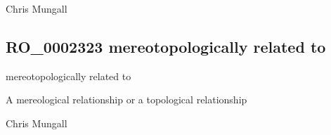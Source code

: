 \documentclass[letterpaper,10pt,english]{sphinxmanual}
\begin{document}
\begin{sphinxShadowBox}

\sphinxAtStartPar
Chris Mungall
\end{sphinxShadowBox}
\begin{quote}

\ignorespaces \end{quote}


\subsection{RO\_0002323 \sphinxhyphen{} mereotopologically related to}
\label{\detokenize{doc-RO_0002323:ro-0002323-mereotopologically-related-to}}\label{\detokenize{doc-RO_0002323:index-0}}\label{\detokenize{doc-RO_0002323::doc}}
\begin{sphinxShadowBox}

\sphinxAtStartPar
mereotopologically related to
\end{sphinxShadowBox}

\begin{sphinxShadowBox}

\sphinxAtStartPar
{}
\end{sphinxShadowBox}

\begin{sphinxShadowBox}

\sphinxAtStartPar
A mereological relationship or a topological relationship
\end{sphinxShadowBox}

\begin{sphinxShadowBox}

\sphinxAtStartPar
{}
\end{sphinxShadowBox}

\begin{sphinxShadowBox}

\sphinxAtStartPar
Chris Mungall
\end{sphinxShadowBox}
\begin{quote}

\ignorespaces \end{quote}
\end{document}

